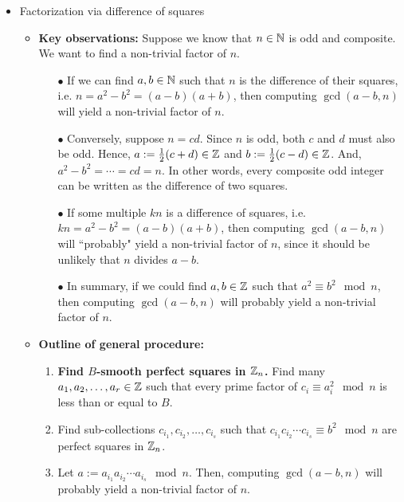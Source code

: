\begin{itemize}
\begin{itemize}
\begin{itemize}
				\end{itemize}
		\end{itemize}
\item	Factorization via difference of squares
		\begin{itemize}
		\item	\textbf{Key observations:}\vskip 0.1cm
				Suppose we know that $n \in \mathbb{N}$ is odd and composite.
				We want to find a non-trivial factor of $n$.
				\begin{itemize}
				\item[$\bullet$]	If we can find $a, b\in\mathbb{N}$ such that $n$ is the difference of their squares,
								i.e. $n = a^{2} - b^{2} = (a-b)(a+b)$,
								then computing $\gcd(a-b,n)$ will yield a non-trivial factor of $n$.
				\item[$\bullet$]	Conversely, suppose $n = cd$.  Since $n$ is odd, both $c$ and $d$
								must also be odd.
								Hence, $a := \frac{1}{2}(c+d) \in \mathbb{Z}$ and $b := \frac{1}{2}(c-d) \in \mathbb{Z}$.
								And, $a^{2} - b^{2} = \cdots = cd = n$.
								In other words, every composite odd integer can be written as the
								difference of two squares.
				\item[$\bullet$]	If some multiple $kn$ is a difference of squares, i.e.
								$kn = a^{2} - b^{2} = (a-b)(a+b)$,
								then computing $\gcd(a-b,n)$ will ``probably" yield a non-trivial factor
								of $n$, since it should be unlikely that $n$ divides $a-b$.
				\item[$\bullet$]	{\color{red}In summary, if we could find $a,b\in\mathbb{Z}$ such that
								$a^{2} \equiv b^{2} \mod n$, then computing $\gcd(a-b,n)$ will
								probably yield a non-trivial factor of $n$.}
				\end{itemize}
		\item	\textbf{Outline of general procedure:}\vskip 0.1cm
				\begin{enumerate}
				\item	\textbf{Find $B$-smooth perfect squares in $\mathbb{Z}_{n}$.}
						Find many $a_{1}, a_{2}, \ldots, a_{r} \in \mathbb{Z}$ such that
						every prime factor of $c_{i} \equiv a_{i}^{2}\mod n$ is less than or equal to $B$.
				\item	Find sub-collections $c_{i_{1}}, c_{i_{2}}, \ldots, c_{i_{s}}$ such that
						$c_{i_{1}} c_{i_{2}} \cdots c_{i_{s}} \equiv b^{2} \mod n$ are
						perfect squares in $\mathbb{Z}_{n}$.
				\item	Let $a := a_{i_{1}} a_{i_{2}} \cdots a_{i_{s}} \mod n$.
						Then, computing $\gcd(a-b,n)$ will probably yield a non-trivial factor of $n$.

\end{enumerate}
\end{itemize}
\end{itemize}

